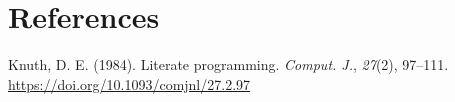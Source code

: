 \documentclass[
  12pt,
  letterpaper,
]{book}
\newlength{\cslhangindent}
\newenvironment{CSLReferences}[2] %
 {\begin{list}{}{%
  \setlength{\itemindent}{0pt}
  \setlength{\leftmargin}{0pt}
  \setlength{\parsep}{0pt}
  \ifodd #1
   \setlength{\leftmargin}{\cslhangindent}
   \setlength{\itemindent}{-1\cslhangindent}
  \fi
  \setlength{\itemsep}{#2\baselineskip}}}
 {\end{list}}
\begin{document}

\chapter*{References}\label{references}


\label{refs}
\begin{CSLReferences}{1}{0}
Knuth, D. E. (1984). Literate programming. \emph{Comput. J.},
\emph{27}(2), 97--111. \url{https://doi.org/10.1093/comjnl/27.2.97}

\end{CSLReferences}


\backmatter
\end{document}
